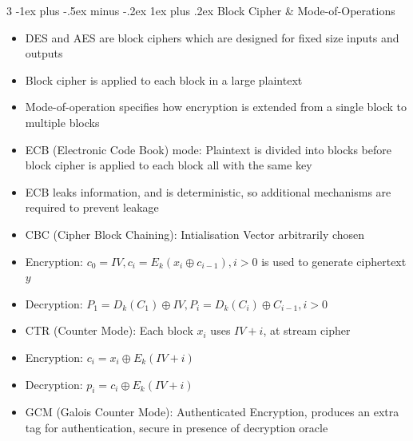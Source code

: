 \documentclass[10pt, landscape]{article}
\makeatletter
\renewcommand{\subsubsection}{\@startsection{subsubsection}{4}{0mm}%
                                {-1ex plus -.5ex minus -.2ex}%
                                {1ex plus .2ex}%
                                {\normalfont\small\bfseries}}%
\makeatother
\begin{document}
\begin{multicols*}{3}
\subsubsection{Block Cipher \& Mode-of-Operations}
\begin{itemize}
    \item DES and AES are block ciphers which are designed for fixed size inputs and outputs
    \item Block cipher is applied to each block in a large plaintext
    \item Mode-of-operation specifies how encryption is extended from a single block to multiple blocks
    \item ECB (Electronic Code Book) mode: Plaintext is divided into blocks before block cipher is applied to each block all with the same key
    \item ECB leaks information, and is deterministic, so additional mechanisms are required to prevent leakage
    \item CBC (Cipher Block Chaining): Intialisation Vector arbitrarily chosen
    \item Encryption: $c_0=IV, c_i=E_k(x_i \oplus c_{i-1}), i>0$ is used to generate ciphertext $y$
    \item Decryption: $P_1 = D_k(C_1) \oplus IV, P_i=D_k(C_i)\oplus C_{i-1}, i>0$
    \item CTR (Counter Mode): Each block $x_i$ uses $IV+i$, at stream cipher
    \item Encryption: $c_i=x_i \oplus E_k(IV+i)$
    \item Decryption: $p_i=c_i \oplus E_k(IV+i)$
    \item GCM (Galois Counter Mode): Authenticated Encryption, produces an extra tag for authentication, secure in presence of decryption oracle
\end{itemize}



\end{multicols*}
\end{document}

